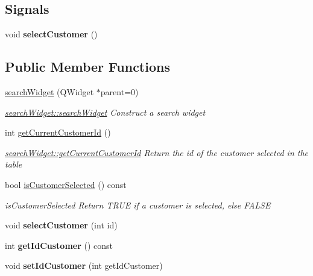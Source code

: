 \subsection*{Signals}
\begin{DoxyCompactItemize}
\item 
\hypertarget{classGui_1_1Widgets_1_1searchWidget_a9b6248c515bac4b6f58237c2f73d804b}{void {\bfseries select\-Customer} ()}\label{classGui_1_1Widgets_1_1searchWidget_a9b6248c515bac4b6f58237c2f73d804b}

\end{DoxyCompactItemize}
\subsection*{Public Member Functions}
\begin{DoxyCompactItemize}
\item 
\hyperlink{classGui_1_1Widgets_1_1searchWidget_a8d77bcf326543f841d1c05fe9819183f}{search\-Widget} (Q\-Widget $\ast$parent=0)
\begin{DoxyCompactList}\small\item\em \hyperlink{classGui_1_1Widgets_1_1searchWidget_a8d77bcf326543f841d1c05fe9819183f}{search\-Widget\-::search\-Widget} Construct a search widget \end{DoxyCompactList}\item 
int \hyperlink{classGui_1_1Widgets_1_1searchWidget_a93c6519cc7e0d8f440451d14fb85bd31}{get\-Current\-Customer\-Id} ()
\begin{DoxyCompactList}\small\item\em \hyperlink{classGui_1_1Widgets_1_1searchWidget_a93c6519cc7e0d8f440451d14fb85bd31}{search\-Widget\-::get\-Current\-Customer\-Id} Return the id of the customer selected in the table \end{DoxyCompactList}\item 
bool \hyperlink{classGui_1_1Widgets_1_1searchWidget_a3cb27e088874c5b8c548d0346a5d85f2}{is\-Customer\-Selected} () const 
\begin{DoxyCompactList}\small\item\em is\-Customer\-Selected Return T\-R\-U\-E if a customer is selected, else F\-A\-L\-S\-E \end{DoxyCompactList}\item 
\hypertarget{classGui_1_1Widgets_1_1searchWidget_a96ba18927785257377dcd3701d41e8d1}{void {\bfseries select\-Customer} (int id)}\label{classGui_1_1Widgets_1_1searchWidget_a96ba18927785257377dcd3701d41e8d1}

\item 
\hypertarget{classGui_1_1Widgets_1_1searchWidget_a20de80dbfa207b4ecc8b12433fcebb4b}{int {\bfseries get\-Id\-Customer} () const }\label{classGui_1_1Widgets_1_1searchWidget_a20de80dbfa207b4ecc8b12433fcebb4b}

\item 
\hypertarget{classGui_1_1Widgets_1_1searchWidget_afeea186f9ca8a0bb2ee4f88cd199281e}{void {\bfseries set\-Id\-Customer} (int get\-Id\-Customer)}\label{classGui_1_1Widgets_1_1searchWidget_afeea186f9ca8a0bb2ee4f88cd199281e}

\end{DoxyCompactItemize}


